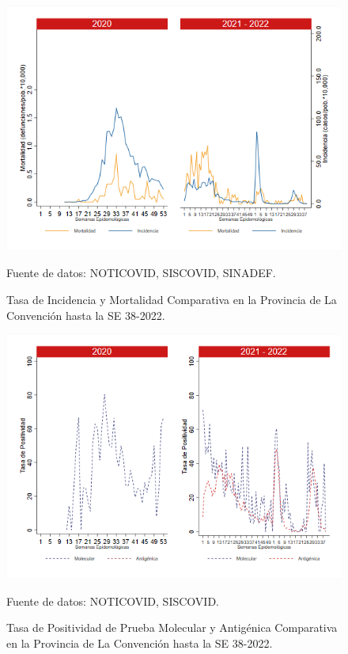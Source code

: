 \documentclass[12pt,a4paper,openany]{book}
\begin{document}
	\begin{figure}[h]
		\caption{Tasa de Incidencia y Mortalidad Comparativa en la Provincia de La Convención hasta la SE 38-2022.}\label{fig:inc_mort_laconv}
		\begin{center}
			\includegraphics[width=0.85\linewidth]{../figuras/incidencia_mortalidad_20_21_9.png}
		\end{center}
		{\footnotesize {Fuente de datos: NOTICOVID, SISCOVID, SINADEF.}}
	\end{figure}
	
	\begin{figure}[h]
		\caption{Tasa de Positividad de Prueba Molecular y Antigénica Comparativa en la Provincia de La Convención hasta la SE 38-2022.}\label{fig:positividad_laconv}
		\begin{center}
			\includegraphics[width=0.7\linewidth]{../figuras/positividad_20_21_9.png}
		\end{center}
		{\footnotesize {Fuente de datos: NOTICOVID, SISCOVID.}}
	\end{figure}
	
\end{document}
